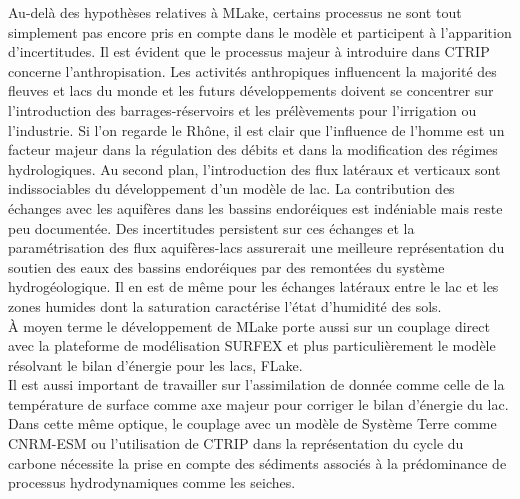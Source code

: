 Au-delà des hypothèses relatives à MLake, certains processus ne sont tout simplement pas encore pris en compte dans le modèle et participent à l'apparition d'incertitudes. Il est évident que le processus majeur à introduire dans CTRIP concerne l'anthropisation. Les activités anthropiques influencent la majorité des fleuves et lacs du monde et les futurs développements doivent se concentrer sur l'introduction des barrages-réservoirs et les prélèvements pour l'irrigation ou l'industrie. Si l'on regarde le Rhône, il est clair que l'influence de l'homme est un facteur majeur dans la régulation des débits et dans la modification des régimes hydrologiques. Au second plan, l'introduction des flux latéraux et verticaux sont indissociables du développement d'un modèle de lac. La contribution des échanges avec les aquifères dans les bassins endoréiques est indéniable mais reste peu documentée. Des incertitudes persistent sur ces échanges et la paramétrisation des flux aquifères-lacs assurerait une meilleure représentation du soutien des eaux des bassins endoréiques par des remontées du système hydrogéologique. Il en est de même pour les échanges latéraux entre le lac et les zones humides dont la saturation caractérise l'état d'humidité des sols.\\
À moyen terme le développement de MLake porte aussi sur un couplage direct avec la plateforme de modélisation SURFEX et plus particulièrement le modèle résolvant le bilan d'énergie pour les lacs, FLake.\\
Il est aussi important de travailler sur l'assimilation de donnée comme celle de la température de surface comme axe majeur pour corriger le bilan d'énergie du lac. Dans cette même optique, le couplage avec un modèle de Système Terre comme CNRM-ESM \citep{seferian2019} ou l'utilisation de CTRIP dans la représentation du cycle du carbone \citep{delire2020} nécessite la prise en compte des sédiments associés à la prédominance de processus hydrodynamiques comme les seiches.\\

